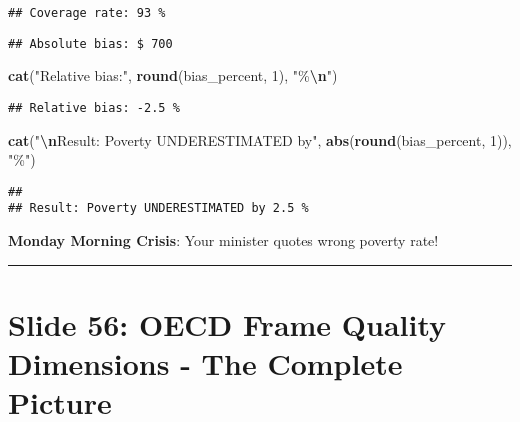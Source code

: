 \documentclass[
]{article}
\newenvironment{Shaded}{\begin{snugshade}}{\end{snugshade}}
\newcommand{\DecValTok}[1]{\textcolor[rgb]{0.00,0.00,0.81}{#1}}
\newcommand{\FunctionTok}[1]{\textcolor[rgb]{0.13,0.29,0.53}{\textbf{#1}}}
\newcommand{\NormalTok}[1]{#1}
\newcommand{\SpecialCharTok}[1]{\textcolor[rgb]{0.81,0.36,0.00}{\textbf{#1}}}
\newcommand{\StringTok}[1]{\textcolor[rgb]{0.31,0.60,0.02}{#1}}
\begin{document}
\begin{verbatim}
## Coverage rate: 93 %
\end{verbatim}

\begin{Shaded}
\end{Shaded}

\begin{verbatim}
## Absolute bias: $ 700
\end{verbatim}

\begin{Shaded}
\begin{Highlighting}[]
\FunctionTok{cat}\NormalTok{(}\StringTok{"Relative bias:"}\NormalTok{, }\FunctionTok{round}\NormalTok{(bias\_percent, }\DecValTok{1}\NormalTok{), }\StringTok{"\%}\SpecialCharTok{\textbackslash{}n}\StringTok{"}\NormalTok{)}
\end{Highlighting}
\end{Shaded}

\begin{verbatim}
## Relative bias: -2.5 %
\end{verbatim}

\begin{Shaded}
\begin{Highlighting}[]
\FunctionTok{cat}\NormalTok{(}\StringTok{"}\SpecialCharTok{\textbackslash{}n}\StringTok{Result: Poverty UNDERESTIMATED by"}\NormalTok{, }\FunctionTok{abs}\NormalTok{(}\FunctionTok{round}\NormalTok{(bias\_percent, }\DecValTok{1}\NormalTok{)), }\StringTok{"\%"}\NormalTok{)}
\end{Highlighting}
\end{Shaded}

\begin{verbatim}
## 
## Result: Poverty UNDERESTIMATED by 2.5 %
\end{verbatim}

\textbf{Monday Morning Crisis}: Your minister quotes wrong poverty rate!

\begin{center}\rule{0.5\linewidth}{0.5pt}\end{center}

\section{Slide 56: OECD Frame Quality Dimensions - The Complete
Picture}\label{slide-56-oecd-frame-quality-dimensions---the-complete-picture}
\end{document}
